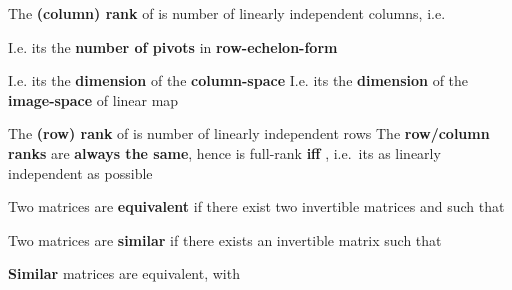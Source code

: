 The \textbf{(column) rank} of  is number of linearly
independent columns, i.e.~

\begin{itemize}

      \vItem
            I.e. its the \textbf{number of pivots} in \textbf{row-echelon-form}

            \begin{itemize}

                  \vItem
                        I.e. its the \textbf{dimension} of the \textbf{column-space}
                  \vItem
                        I.e. its the \textbf{dimension} of the \textbf{image-space}
                         of linear map
            \end{itemize}
      \vItem
            The \textbf{(row) rank} of  is number of linearly
            independent rows
      \vItem
            The \textbf{row/column ranks} are \textbf{always the same}, hence
      \vItem
             is full-rank \textbf{iff}
            , i.e.~its as linearly independent
            as possible
\end{itemize}

\hSep %

Two matrices
are \textbf{equivalent} if there exist two invertible matrices
  and
 such that

Two matrices
are \textbf{similar} if there exists an invertible matrix
  such that

\begin{itemize}

      \vItem
            \textbf{Similar} matrices are equivalent, with
\end{itemize}

